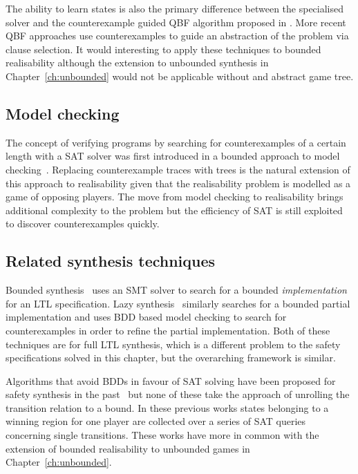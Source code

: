 The ability to learn states is also the primary difference between the specialised solver and the counterexample guided QBF algorithm proposed in \cite{Janota12}. More recent QBF approaches use counterexamples to guide an abstraction of the problem via clause selection. It would interesting to apply these techniques to bounded realisability although the extension to unbounded synthesis in Chapter~\ref{ch:unbounded} would not be applicable without and abstract game tree.

\subsection{Model checking}

The concept of verifying programs by searching for counterexamples of a certain length with a SAT solver was first introduced in a bounded approach to model checking~\cite{Biere99}. Replacing counterexample traces with trees is the natural extension of this approach to realisability given that the realisability problem is modelled as a game of opposing players.  The move from model checking to realisability brings additional complexity to the problem but the efficiency of SAT is still exploited to discover counterexamples quickly.

\subsection{Related synthesis techniques}

Bounded synthesis~\cite{Finkbeiner13} uses an SMT solver to search for a bounded \emph{implementation} for an LTL specification. Lazy synthesis~\cite{Finkbeiner12} similarly searches for a bounded partial implementation and uses BDD based model checking to search for counterexamples in order to refine the partial implementation. Both of these techniques are for full LTL synthesis, which is a different problem to the safety specifications solved in this chapter, but the overarching framework is similar. 

Algorithms that avoid BDDs in favour of SAT solving have been proposed for safety synthesis in the past~\cite{Morgenstern13,Chiang15,Bloem14} but none of these take the approach of unrolling the transition relation to a bound. In these previous works states belonging to a winning region for one player are collected over a series of SAT queries concerning single transitions. These works have more in common with the extension of bounded realisability to unbounded games in Chapter~\ref{ch:unbounded}.

